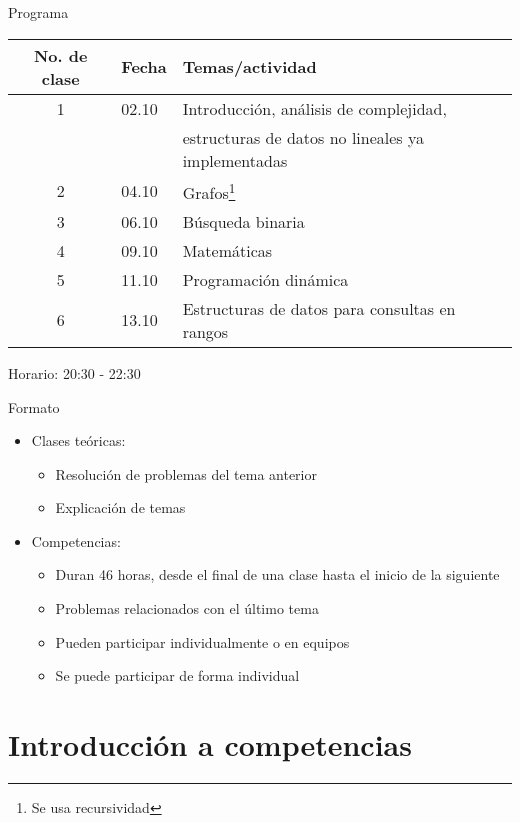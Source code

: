 \documentclass[10pt]{beamer}
\newcommand{\bi}{\begin{itemize}}
\newcommand{\ei}{\end{itemize}}
\begin{document}
\begin{frame}{Programa}
    \begin{center}
        \begin{tabular}{cl|l}

            No. de clase & Fecha & Temas/actividad \\
            \hline
            1 & 02.10 & Introducción, análisis de complejidad, \\ 
              &       & estructuras de datos no lineales ya implementadas \\
            2 & 04.10 & Grafos\footnote{Se usa recursividad}\addtocounter{footnote}{-1} \\
            3 & 06.10 & Búsqueda binaria \\
            \hline
            4 & 09.10 & Matemáticas \\
            5 & 11.10 & Programación dinámica\footnotemark\addtocounter{footnote}{-1} \\
            6 & 13.10 & Estructuras de datos para consultas en rangos\footnotemark \\
            \hline
        \end{tabular}
    \end{center}
    Horario: 20:30 - 22:30
\end{frame}

\begin{frame}{Formato}
    \bi
        \item Clases teóricas: 
        \bi
            \item Resolución de problemas del tema anterior
            \item Explicación de temas
        \ei
        \item Competencias:
        \bi
            \item Duran 46 horas, desde el final de una clase 
            hasta el inicio de la siguiente
            \item Problemas relacionados con el último tema
            \item Pueden participar individualmente o en equipos
            \item Se puede participar de forma individual
        \ei
    \ei
\end{frame}

\section{Introducción a competencias}
\end{document}
